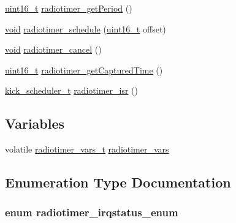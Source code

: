 \begin{DoxyCompactItemize}
\item 
\hyperlink{_p_e___types_8h_a1f1825b69244eb3ad2c7165ddc99c956}{uint16\+\_\+t} \hyperlink{group__radiotimer_ga6e96a37a1a07cb7ec7639bfb44759437}{radiotimer\+\_\+get\+Period} ()
\item 
\hyperlink{usb__devapi_8h_afabf60e7f57651d6d595a02c75f07cd0}{void} \hyperlink{iot-lab___m3_2radiotimer_8c_ab52f92ecf9d7dd4bcc893119f8cdb4ed}{radiotimer\+\_\+schedule} (\hyperlink{_p_e___types_8h_a1f1825b69244eb3ad2c7165ddc99c956}{uint16\+\_\+t} offset)
\item 
\hyperlink{usb__devapi_8h_afabf60e7f57651d6d595a02c75f07cd0}{void} \hyperlink{group__radiotimer_ga87b29bd5be3a34ea714da11d244e43f2}{radiotimer\+\_\+cancel} ()
\item 
\hyperlink{_p_e___types_8h_a1f1825b69244eb3ad2c7165ddc99c956}{uint16\+\_\+t} \hyperlink{group__radiotimer_ga3f869c34f63741cf1aa6e43321662f78}{radiotimer\+\_\+get\+Captured\+Time} ()
\item 
\hyperlink{group__board_gac9ebdcc0a4f3c8422f5f4f0fbbe0ded0}{kick\+\_\+scheduler\+\_\+t} \hyperlink{group__radiotimer_ga45ba49be562da796046e90c03fdb1433}{radiotimer\+\_\+isr} ()
\end{DoxyCompactItemize}
\subsection*{Variables}
\begin{DoxyCompactItemize}
\item 
volatile \hyperlink{structradiotimer__vars__t}{radiotimer\+\_\+vars\+\_\+t} \hyperlink{iot-lab___m3_2radiotimer_8c_adedbe6745fb701ef34c3e73605a6e343}{radiotimer\+\_\+vars}
\end{DoxyCompactItemize}


\subsection{Enumeration Type Documentation}
\subsubsection[{\texorpdfstring{radiotimer\+\_\+irqstatus\+\_\+enum}{radiotimer_irqstatus_enum}}]{\setlength{\rightskip}{0pt plus 5cm}enum {\bf radiotimer\+\_\+irqstatus\+\_\+enum}}\hypertarget{iot-lab___m3_2radiotimer_8c_a0d1e20bf6acea8d0f232765070d96471}{}\label{iot-lab___m3_2radiotimer_8c_a0d1e20bf6acea8d0f232765070d96471}


